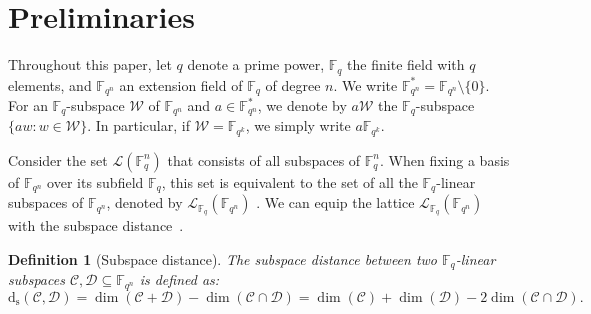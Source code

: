 \documentclass{article}
\newtheorem{definition}{Definition}
\newcommand{\Fq}{\mathbb{F}_{q}}
\newcommand{\Fqn}{\mathbb{F}_{q^n}}
\newcommand{\Fqk}{\mathbb{F}_{q^k}}
\newcommand{\ds}{\mathrm{d_s}}
\newcommand{\calC}{\mathcal{C}}
\newcommand{\calD}{\mathcal{D}}
\newcommand{\calL}{\mathcal{L}}
\newcommand{\calW}{\mathcal{W}}
\begin{document}
\section{Preliminaries}
\label{sec: preliminaries}
Throughout this paper, let $q$ denote a prime power, $\Fq$ the finite field with $q$ elements, and $\Fqn$ an extension field of $\Fq$ of degree $n$. We write $\Fqn^*=\Fqn\setminus\{0\}$. For an $\Fq$-subspace $\calW$ of $\Fqn$ and $a\in\Fqn^*$, we denote by $a\calW$ the $\Fq$-subspace $\{aw : w\in\calW\}$. In particular, if $\calW=\Fqk$, we simply write $a\Fqk$.
\par Consider the set $\calL(\Fq^n)$ that consists of all subspaces of $\Fq^n.$
When fixing a basis of $\Fqn$ over its subfield $\Fq$, this set is equivalent to the set of all the $\Fq$-linear subspaces of $\Fqn$, denoted by $\calL_{\Fq}(\Fqn)$ . 
We can equip the lattice $\calL_{\Fq}(\Fqn)$ with the subspace distance~\cite{Kotter08}.
\begin{definition}[Subspace distance]
    The subspace distance between two $\Fq$-linear subspaces $\calC,\calD \subseteq \Fqn$ is defined as:
    \[
     \ds(\calC,\calD) =  \dim(\calC + \calD) - \dim(\calC \cap \calD) = \dim(\calC) + \dim(\calD) - 2 \dim(\calC \cap \calD).
    \]
\end{definition}
\end{document}
